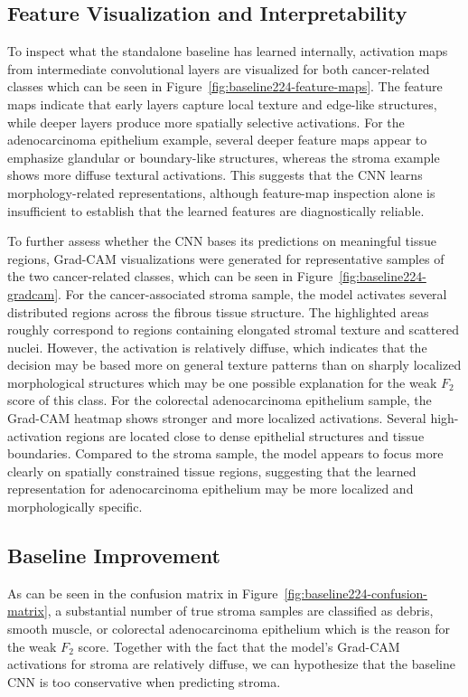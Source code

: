 \subsection{Feature Visualization and Interpretability}
To inspect what the standalone baseline has learned internally, activation maps
from intermediate convolutional layers are visualized for both cancer-related
classes which can be seen in Figure~\ref{fig:baseline224-feature-maps}.
The feature maps indicate that early layers capture local texture and edge-like
structures, while deeper layers produce more spatially selective activations.
For the adenocarcinoma epithelium example, several deeper feature maps appear to
emphasize glandular or boundary-like structures, whereas the stroma example
shows more diffuse textural activations. This suggests that the CNN learns
morphology-related representations, although feature-map inspection alone is
insufficient to establish that the learned features are diagnostically reliable.


To further assess whether the CNN bases its predictions on meaningful tissue
regions, Grad-CAM visualizations were generated for representative samples of
the two cancer-related classes, which can be seen in
Figure~\ref{fig:baseline224-gradcam}.
For the cancer-associated stroma sample, the model activates several distributed
regions across the fibrous tissue structure. The highlighted areas roughly
correspond to regions containing elongated stromal texture and scattered nuclei.
However, the activation is relatively diffuse, which indicates that the decision
may be based more on general texture patterns than on sharply localized
morphological structures which may be one possible explanation for the weak
$F_2$ score of this class. For the colorectal adenocarcinoma epithelium sample,
the Grad-CAM heatmap shows stronger and more localized activations. Several
high-activation regions are located close to dense epithelial structures and
tissue boundaries. Compared to the stroma sample, the model appears to focus
more clearly on spatially constrained tissue regions, suggesting that the
learned representation for adenocarcinoma epithelium may be more localized and
morphologically specific.


\subsection{Baseline Improvement}
As can be seen in the confusion matrix in 
Figure~\ref{fig:baseline224-confusion-matrix}, a substantial number of true
stroma samples are classified as debris, smooth muscle, or colorectal
adenocarcinoma epithelium which is the reason for the weak $F_2$ score. Together
with the fact that the model's Grad-CAM activations for stroma are relatively
diffuse, we can hypothesize that the baseline CNN is too conservative when
predicting stroma.

